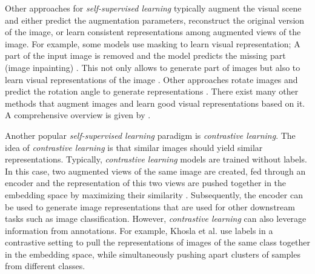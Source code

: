 Other approaches for \emph{self-supervised learning} typically augment the visual scene and either predict the augmentation parameters, reconstruct the original version of the image, or learn consistent representations among augmented views of the image.
For example, some models use masking to learn visual representation;
A part of the input image is removed and the model predicts the missing part (image inpainting) \cite{Elharrouss_Almaadeed_Al-Maadeed_Akbari_2020}.
This not only allows to generate part of images but also to learn visual representations of the image .
Other approaches rotate images and predict the rotation angle to generate representations .
There exist many other methods that augment images and learn good visual representations based on it.
A comprehensive overview is given by .

Another popular \emph{self-supervised learning} paradigm is \emph{contrastive learning}.
The idea of \emph{contrastive learning} is that similar images should yield similar representations.
Typically, \emph{contrastive learning} models are trained without labels.
In this case, two augmented views of the same image are created, fed through an encoder and the representation of this two views are pushed together in the embedding space by maximizing their similarity .
Subsequently, the encoder can be used to generate image representations that are used for other downstream tasks such as image classification.
However, \emph{contrastive learning} can also leverage information from annotations.
For example, Khosla et al.  use labels in a contrastive setting to pull the representations of images of the same class together in the embedding space, while simultaneously pushing apart clusters of samples from different classes.


